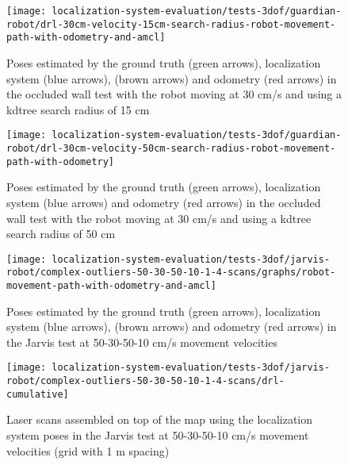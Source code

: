\begin{figure}[H]
	\centering
	\texttt{[image: localization-system-evaluation/tests-3dof/guardian-robot/drl-30cm-velocity-15cm-search-radius-robot-movement-path-with-odometry-and-amcl]}
	\caption{Poses estimated by the ground truth (green arrows), localization system (blue arrows),  (brown arrows) and odometry (red arrows) in the occluded wall test with the robot moving at 30 cm/s and using a kdtree search radius of 15 cm}
	\label{fig:localization-system-evaluation_guardian-drl-30cm-velocity-15cm-search-radius-path}
\end{figure}

\begin{figure}[H]
	\centering
	\texttt{[image: localization-system-evaluation/tests-3dof/guardian-robot/drl-30cm-velocity-50cm-search-radius-robot-movement-path-with-odometry]}
	\caption{Poses estimated by the ground truth (green arrows), localization system (blue arrows) and odometry (red arrows) in the occluded wall test with the robot moving at 30 cm/s and using a kdtree search radius of 50 cm}
	\label{fig:localization-system-evaluation_guardian-drl-30cm-velocity-50cm-search-radius-path}
\end{figure}


\begin{figure}[H]
	\centering
	\texttt{[image: localization-system-evaluation/tests-3dof/jarvis-robot/complex-outliers-50-30-50-10-1-4-scans/graphs/robot-movement-path-with-odometry-and-amcl]}
	\caption{Poses estimated by the ground truth (green arrows), localization system (blue arrows),  (brown arrows) and odometry (red arrows) in the Jarvis test at 50-30-50-10 cm/s movement velocities}
	\label{fig:localization-system-evaluation_complex-path-with-outliers-50-30-50-10cm-per-sec-velocity-1-4-scans-paths}
\end{figure}

\begin{figure}[H]
	\centering
	\texttt{[image: localization-system-evaluation/tests-3dof/jarvis-robot/complex-outliers-50-30-50-10-1-4-scans/drl-cumulative]}
	\caption{Laser scans assembled on top of the map using the localization system poses in the Jarvis test at 50-30-50-10 cm/s movement velocities (grid with 1 m spacing)}
	\label{fig:localization-system-evaluation_complex-path-with-outliers-50-30-50-10cm-per-sec-velocity-1-4-scans-drl-cumulative}
\end{figure}

